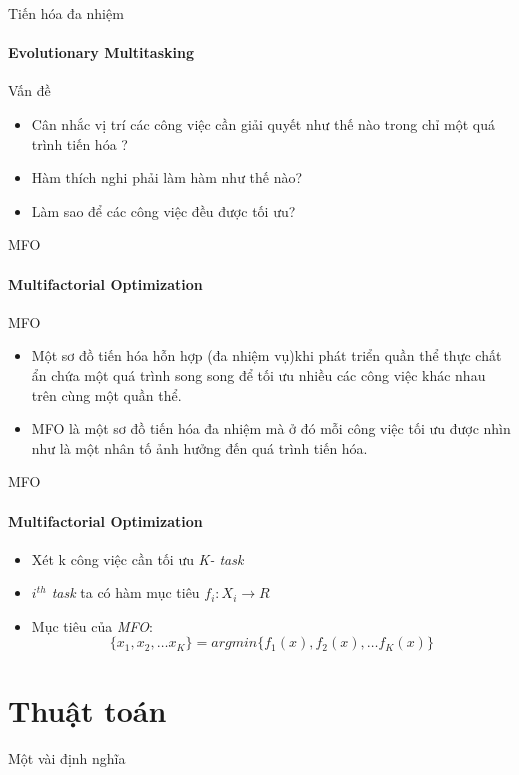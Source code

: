\documentclass[compress]{beamer}
\begin{document}
\begin{frame}{Tiến hóa đa nhiệm}
\framesubtitle{Evolutionary Multitasking}
\begin{exampleblock}{Vấn đề }
\begin{itemize}
\pause
\item Cân nhắc vị trí các công việc cần giải quyết như thế nào trong chỉ một quá trình tiến hóa ?
\pause
\item Hàm thích nghi phải làm hàm như thế nào? 
\pause
\item Làm sao để các công việc đều được tối ưu?
\end{itemize}
\end{exampleblock}
\end{frame}
\begin{frame}{MFO}
\framesubtitle{Multifactorial Optimization}
\begin{block}{MFO}
\begin{itemize}
\item Một sơ đồ tiến hóa hỗn hợp (đa nhiệm vụ)khi phát triển quần thể  thực chất ẩn chứa một quá trình song song để tối ưu nhiều các công việc khác nhau trên cùng một quần thể.
\pause
\item MFO là một sơ đồ tiến hóa đa nhiệm mà ở đó mỗi công việc tối ưu được nhìn như là một nhân tố ảnh hưởng đến quá trình tiến hóa.
\end{itemize}
\end{block}
\end{frame}
\begin{frame}{MFO}
\framesubtitle{Multifactorial Optimization}
\begin{itemize}
\item Xét k công việc cần tối ưu \textit{K- task}
\item \textit{$i^{th}$ task} ta có hàm mục tiêu $f_i: X_i \longrightarrow R$
\item Mục tiêu của \textit{MFO}: 
$$\{x_1, x_2, \ldots x_K\}= argmin\{f_1(x), f_2(x), \ldots f_K(x)\}$$
\end{itemize}
\end{frame}

\section{Thuật toán}
\begin{frame}{Một vài định nghĩa}
\end{frame} 
\end{document}
